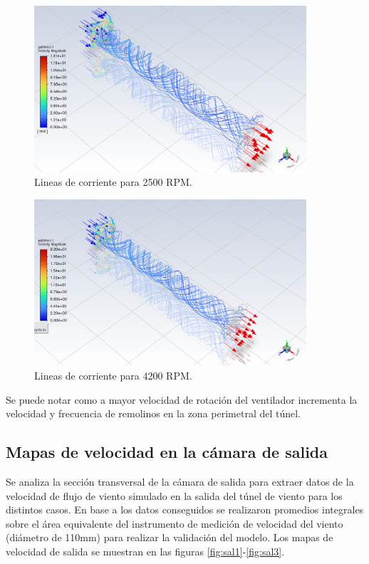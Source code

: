 \begin{figure}[ht!]
    \centering
    \includegraphics[width=0.9\textwidth]{images/cor2.png}
    \caption{Lineas de corriente para 2500 RPM.}
    \label{fig:cor2}
\end{figure}

\pagebreak
\begin{figure}[ht!]
    \centering
    \includegraphics[width=0.9\textwidth]{images/cor3.png}
    \caption{Lineas de corriente para 4200 RPM.}
    \label{fig:cor3}
\end{figure}

Se puede notar como a mayor velocidad de rotación del ventilador incrementa la velocidad y frecuencia de remolinos en la zona perimetral del túnel.

\subsection{Mapas de velocidad en la cámara de salida}

Se analiza la sección transversal de la cámara de salida para extraer datos de la velocidad de flujo de viento simulado en la salida del túnel de viento para los distintos casos. En base a los datos conseguidos se realizaron promedios integrales sobre el área equivalente del instrumento de medición de velocidad del viento (diámetro de 110mm) para realizar la validación del modelo. Los mapas de velocidad de salida se muestran en las figuras \ref{fig:sal1}-\ref{fig:sal3}.

